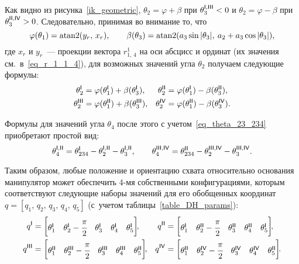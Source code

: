 Как видно из рисунка~\ref{ik_geometric}, $\theta_2 = \varphi + \beta$ при $\theta_3^{\mathsf{I,III}} < 0$ и $\theta_2 = \varphi - \beta$ при $\theta_3^{\mathsf{II,IV}} > 0$.
Следовательно, принимая во внимание то, что
\begin{equation}
    \varphi(\theta_1) = \atan2(y_r,\, x_r),
    \qquad
    \beta(\theta_3) = \atan2(a_3\sin|\theta_3|,\: a_2 + a_3\cos|\theta_3|),
\end{equation}
где $x_r$ и $y_r$~--- проекции вектора $r^1_{1,\,4}$ на оси абсцисс и ординат (их значения см.~в~\eqref{eq_r_1_1_4}), для возможных значений угла $\theta_2$ получаем следующие формулы:
\begin{align}
	\theta_2^{\mathsf{I}} &= \varphi(\theta_1^{\mathsf{I}}) + \beta(\theta_3^{\mathsf{I}}), &
	\theta_2^{\mathsf{II}} &= \varphi(\theta_1^{\mathsf{I}}) - \beta(\theta_3^{\mathsf{II}}),\\
	\theta_2^{\mathsf{III}} &= \varphi(\theta_1^{\mathsf{II}}) + \beta(\theta_3^{\mathsf{III}}), &
	\theta_2^{\mathsf{IV}} &= \varphi(\theta_1^{\mathsf{II}}) - \beta(\theta_3^{\mathsf{IV}})\ldotp
\end{align}

Формулы для значений угла $\theta_4$ после этого с учетом~\eqref{eq_theta_23_234} приобретают простой вид:
\begin{equation}
	\theta_4^{\mathsf{I,II}} = \theta_{234}^{\mathsf{I}} - \theta_{2}^{\mathsf{I,II}} - \theta_{3}^{\mathsf{I,II}},
	\qquad
	\theta_4^{\mathsf{III,IV}} = \theta_{234}^{\mathsf{II}} - \theta_{2}^{\mathsf{III, IV}} - \theta_{3}^{\mathsf{III,IV}}\ldotp
\end{equation}

Таким образом, любые положение и ориентацию схвата относительно основания манипулятор может обеспечить 4-мя собственными конфигурациями, которым соответствуют следующие наборы значений для его обобщенных координат $q=\left[q_1,\,q_2,\,q_3,\,q_4,\,q_5\right]$ (с~учетом таблицы~\ref{table_DH_params}):
\begin{align}
	q^\msf{I} &=
	\begin{bmatrix}
	    \theta_1^\msf{I} & \theta_2^\msf{I} - \cfrac{\pi}{2} & \theta_3^\msf{I} & \theta_4^\msf{I} & \theta_5^\msf{I}
	\end{bmatrix}\!\!,
	&
	q^\msf{II} &=
	\begin{bmatrix}
	    \theta_1^\msf{I} & \theta_2^\msf{II} - \cfrac{\pi}{2} & \theta_3^\msf{II} & \theta_4^\msf{II} & \theta_5^\msf{I}
	\end{bmatrix}\!\!,
	\\
	q^\msf{III} &=
	\begin{bmatrix}
	    \theta_1^\msf{II} & \theta_2^\msf{III} - \cfrac{\pi}{2} & \theta_3^\msf{III} & \theta_4^\msf{III} & \theta_5^\msf{II}
	\end{bmatrix}\!\!,
	&
	q^\msf{IV} &=
	\begin{bmatrix}
	    \theta_1^\msf{II} & \theta_2^\msf{IV} - \cfrac{\pi}{2} & \theta_3^\msf{IV} & \theta_4^\msf{IV} & \theta_5^\msf{II}
	\end{bmatrix}\!\!\ldotp
\end{align}

\newpage